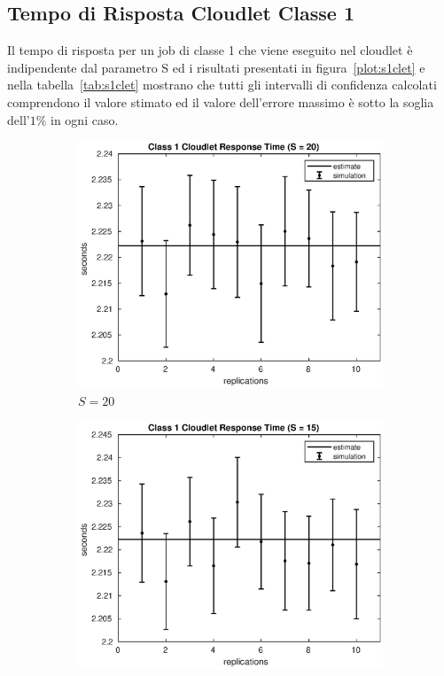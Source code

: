 \subsection{Tempo di Risposta Cloudlet Classe 1}
Il tempo di risposta per un job di classe 1 che viene eseguito nel cloudlet è
indipendente dal parametro S ed i risultati presentati in
figura~\ref{plot:s1clet} e nella tabella~\ref{tab:s1clet} mostrano che tutti gli
intervalli di confidenza calcolati comprendono il valore stimato ed il valore
dell'errore massimo è sotto la soglia dell'$1\%$ in ogni caso.
\begin{figure}[!h]
\centering
%
\begin{subfigure}[t]{0.49\textwidth}
\includegraphics[width=\textwidth]{figures/simul/20_500K_s1clet}
\caption{$S = 20$}
\label{20_s1clet}
\end{subfigure}
%
\begin{subfigure}[t]{0.49\textwidth}
\includegraphics[width=\textwidth]{figures/simul/15_500K_s1clet}

\end{subfigure}
\end{figure}
